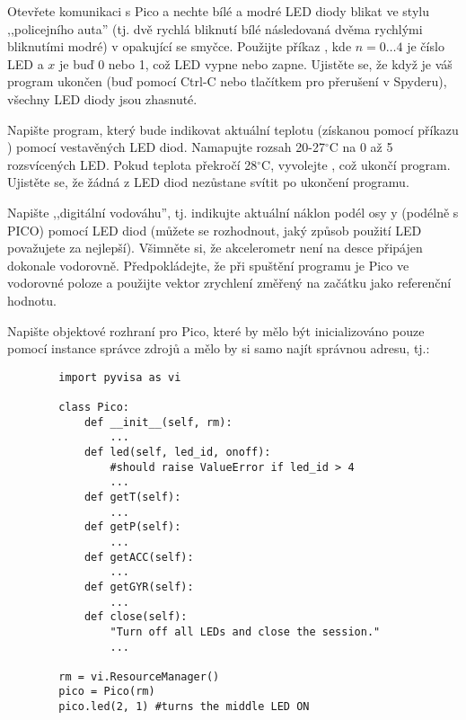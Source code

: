 \begin{exercise}
    Otevřete komunikaci s Pico a nechte bílé a modré LED diody blikat ve stylu ,,policejního auta'' (tj. dvě rychlá bliknutí bílé následovaná dvěma rychlými bliknutími modré) v opakující se smyčce. Použijte příkaz , kde $n=0\dots 4$ je číslo LED a $x$ je buď 0 nebo 1, což LED vypne nebo zapne. Ujistěte se, že když je váš program ukončen (buď pomocí Ctrl-C nebo tlačítkem pro přerušení v Spyderu), všechny LED diody jsou zhasnuté.
\end{exercise}

\begin{exercise}
    Napište program, který bude indikovat aktuální teplotu (získanou pomocí příkazu ) pomocí vestavěných LED diod. Namapujte rozsah 20-27$^\circ$C na 0 až 5 rozsvícených LED. Pokud teplota překročí 28$^\circ$C, vyvolejte , což ukončí program. Ujistěte se, že žádná z LED diod nezůstane svítit po ukončení programu.
\end{exercise}

\begin{exercise}
    Napište ,,digitální vodováhu'', tj. indikujte aktuální náklon podél osy y (podélně s PICO) pomocí LED diod (můžete se rozhodnout, jaký způsob použití LED považujete za nejlepší). Všimněte si, že akcelerometr není na desce připájen dokonale vodorovně. Předpokládejte, že při spuštění programu je Pico ve vodorovné poloze a použijte vektor zrychlení změřený na začátku jako referenční hodnotu.
\end{exercise}

\begin{exercise}
    Napište objektové rozhraní pro Pico, které by mělo být inicializováno pouze pomocí instance správce zdrojů a mělo by si samo najít správnou adresu, tj.:
    \begin{lstlisting}
        import pyvisa as vi

        class Pico:
            def __init__(self, rm):
                ...
            def led(self, led_id, onoff):
                #should raise ValueError if led_id > 4
                ...
            def getT(self):
                ...
            def getP(self):
                ...
            def getACC(self):
                ...
            def getGYR(self):
                ...
            def close(self):
                "Turn off all LEDs and close the session."
                ...
        
        rm = vi.ResourceManager()
        pico = Pico(rm)
        pico.led(2, 1) #turns the middle LED ON
    \end{lstlisting}
\end{exercise}

